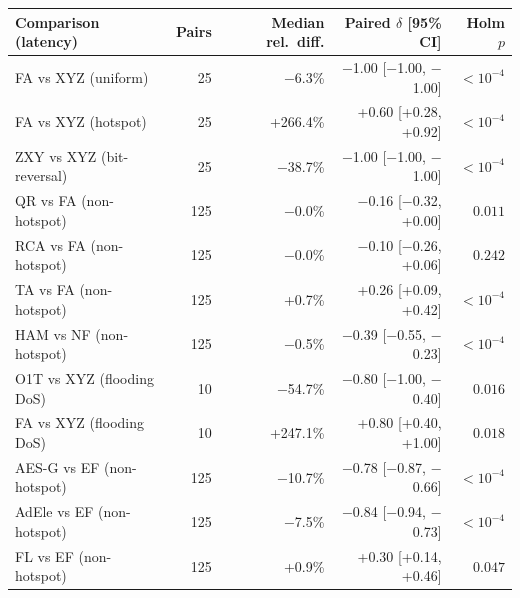 \begin{tabular}{@{}lrrrr@{}}
\toprule
Comparison (latency) & Pairs & Median rel.\ diff. & Paired $\delta$ [95\% CI] & Holm $p$ \\
\midrule
FA vs XYZ (uniform) & 25 & $-$6.3\% & $-$1.00 [$-$1.00, $-$1.00] & $<10^{-4}$ \\
FA vs XYZ (hotspot) & 25 & +266.4\% & +0.60 [+0.28, +0.92] & $<10^{-4}$ \\
ZXY vs XYZ (bit-reversal) & 25 & $-$38.7\% & $-$1.00 [$-$1.00, $-$1.00] & $<10^{-4}$ \\
QR vs FA (non-hotspot) & 125 & $-$0.0\% & $-$0.16 [$-$0.32, +0.00] & $0.011$ \\
RCA vs FA (non-hotspot) & 125 & $-$0.0\% & $-$0.10 [$-$0.26, +0.06] & $0.242$ \\
TA vs FA (non-hotspot) & 125 & +0.7\% & +0.26 [+0.09, +0.42] & $<10^{-4}$ \\
HAM vs NF (non-hotspot) & 125 & $-$0.5\% & $-$0.39 [$-$0.55, $-$0.23] & $<10^{-4}$ \\
O1T vs XYZ (flooding DoS) & 10 & $-$54.7\% & $-$0.80 [$-$1.00, $-$0.40] & $0.016$ \\
FA vs XYZ (flooding DoS) & 10 & +247.1\% & +0.80 [+0.40, +1.00] & $0.018$ \\
AES-G vs EF (non-hotspot) & 125 & $-$10.7\% & $-$0.78 [$-$0.87, $-$0.66] & $<10^{-4}$ \\
AdEle vs EF (non-hotspot) & 125 & $-$7.5\% & $-$0.84 [$-$0.94, $-$0.73] & $<10^{-4}$ \\
FL vs EF (non-hotspot) & 125 & +0.9\% & +0.30 [+0.14, +0.46] & $0.047$ \\
\bottomrule
\end{tabular}
